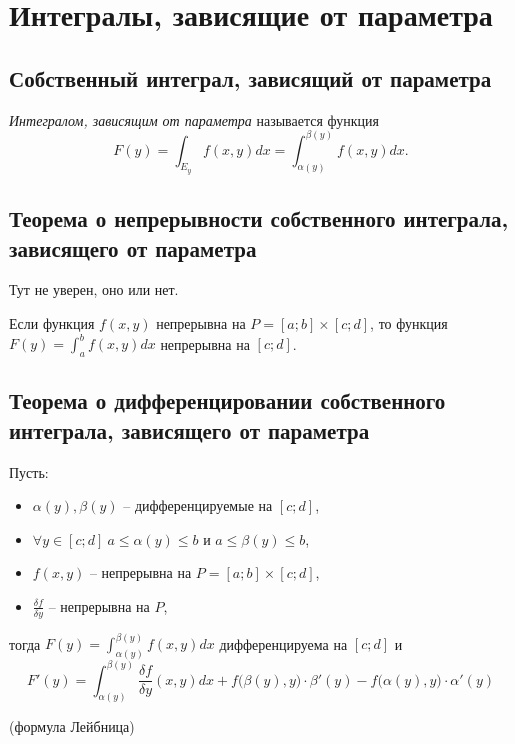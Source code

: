 \section{Интегралы, зависящие от параметра}

\setcounter{subsection}{103}

\subsection{Собственный интеграл, зависящий от параметра}

\begin{definition}
    \emph{Интегралом, зависящим от параметра} называется функция
    \[
        F(y) = \int_{E_y}f(x,y)dx = \int_{\alpha(y)}^{\beta(y)}f(x,y)dx.
    \]
\end{definition}

\subsection{Теорема о непрерывности собственного интеграла, зависящего от параметра}

Тут не уверен, оно или нет.

\begin{theorem}\label{theorem:7.1.1}
    Если функция $f(x,y)$ непрерывна на $P = [a;b] \times [c;d]$, то функция $F(y) = \int_{a}^{b}f(x,y)dx$ непрерывна на $[c;d]$.
\end{theorem}

\subsection{Теорема о дифференцировании собственного интеграла, зависящего от параметра}

\begin{theorem}\label{theorem:7.1.2}
    Пусть:
    \begin{itemize}
        \item $\alpha(y), \beta(y)$ -- дифференцируемые на $[c;d]$,
        \item $\forall y \in [c;d] \ a\leqslant \alpha(y) \leqslant b$ и $a \leqslant \beta(y) \leqslant b$,
        \item $f(x,y)$ -- непрерывна на $P = [a;b] \times [c;d]$,
        \item $\frac{\delta f}{\delta y}$ -- непрерывна на $P$,
    \end{itemize}
    тогда $F(y) = \int_{\alpha(y)}^{\beta(y)}f(x,y)dx$ дифференцируема на $[c;d]$ и
    \[
        F'(y) = \int_{\alpha(y)}^{\beta(y)}\frac{\delta f}{\delta y}(x,y)dx + f\big(\beta(y),y\big) \cdot \beta'(y) - f\big(\alpha(y),y\big)\cdot \alpha'(y)
    \]
    \begin{center}
        (формула Лейбница)
    \end{center}
\end{theorem}

